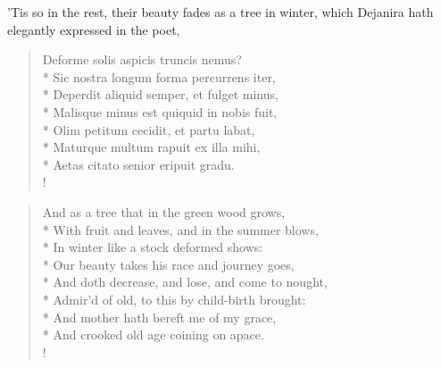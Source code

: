 'Tis so in the rest, their beauty fades as a tree in winter, which Dejanira
hath elegantly expressed in the poet,
%
\begin{latin}%
\begin{verse}%
Deforme solis aspicis truncis nemus?\\*
Sic nostra longum forma percurrens iter,\\*
Deperdit aliquid semper, et fulget minus,\\*
Malisque minus est quiquid in nobis fuit,\\*
Olim petitum cecidit, et partu labat,\\*
Maturque multum rapuit ex illa mihi,\\*
Aetas citato senior eripuit gradu.\\!
\end{verse}%
\end{latin}%
\translationrule%
\begin{verse}%
And as a tree that in the green wood grows,\\*
With fruit and leaves, and in the summer blows,\\*
In winter like a stock deformed shows:\\*
Our beauty takes his race and journey goes,\\*
And doth decrease, and lose, and come to nought,\\*
Admir'd of old, to this by child-birth brought:\\*
And mother hath bereft me of my grace,\\*
And crooked old age coining on apace.\\!
\end{verse}%
%

